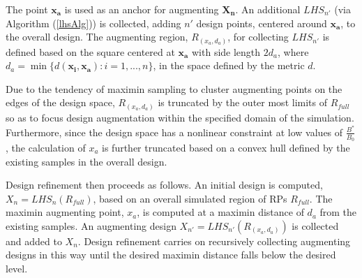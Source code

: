 \documentclass[12pt]{article}
\begin{document}
%
The point $\bm{x_a}$ is used as an anchor for augmenting $\bm{X_n}$. %
An additional $LHS_{n'}$ (via Algorithm (\ref{lhsAlg})) is collected, adding 
$n'$ design points, centered around $\bm{x_a}$, to the overall design. %
The augmenting region, $R_{(x_a, d_a)}$, for collecting $LHS_{n'}$ is defined 
based on the square centered at $\bm{x_a}$ with side length $2d_a$, where 
\mbox{$d_a = \min\{ d(\bm{x_i}, \bm{x_a}): i=1,...,n \}$}, in the space defined 
by the metric $d$.
%

%
Due to the tendency of maximin sampling to cluster augmenting points on the edges 
of the design space, $R_{(x_a, d_a)}$ is truncated by the outer most limits of 
$R_{full}$ so as to focus design augmentation within the specified domain of the 
simulation. Furthermore, since the design space has a nonlinear constraint at low 
values of $\frac{B^*}{B_0}$, the calculation of $x_a$ is further truncated 
based on a convex hull defined by the existing samples in the overall design.

%

%
Design refinement then proceeds as follows. An initial design is computed, $X_{n} = LHS_{n}(R_{full})$, %
based on an overall simulated region of RPs $R_{full}$. The maximin augmenting 
point, $x_a$, is computed at a maximin distance of $d_a$ from the existing samples. 
An augmenting design $X_{n'} = LHS_{n'}(R_{(x_a, d_a)})$ is collected and 
added to $X_n$. Design refinement carries on recursively collecting augmenting 
designs in this way until the desired maximin distance falls below the desired 
level.
 

\end{document}
